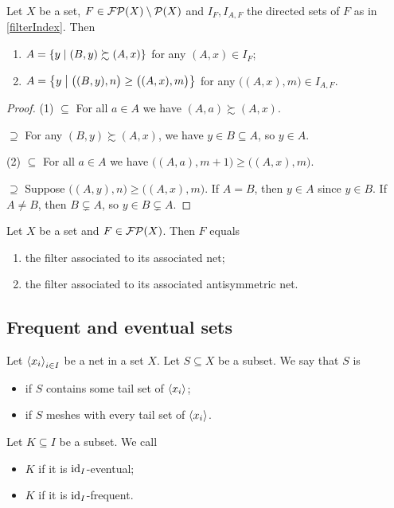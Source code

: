 \begin{lemma} \label{tailsFilterIndex}
Let $X$ be a set, $F\in\operatorname{\mathcal{FP}}(X)\setminus\operatorname{\mathcal{P}}(X)$ and $I_F, I_{A,F}$ the directed sets of $F$ as in \ref{filterIndex}. Then
\begin{enumerate}
\item $A = \setbuilder{y}{(B,y) \succsim (A,x)}$ for any $(A,x)\in I_F$;
\item $A = \setbuilder{y}{\big((B,y), n\big) \geq \big((A,x), m\big)}$ for any $\big((A,x), m\big)\in I_{A,F}$.
\end{enumerate}
\end{lemma}
\begin{proof}
(1) $\boxed{\subseteq}$ For all $a\in A$ we have $(A,a)\succsim (A,x)$.

$\boxed{\supseteq}$ For any $(B,y) \succsim (A,x)$, we have $y\in B\subseteq A$, so $y\in A$.

(2) $\boxed{\subseteq}$ For all $a\in A$ we have $\big((A,a), m+1\big) \geq \big((A,x), m\big)$.

$\boxed{\supseteq}$ Suppose $\big((A,y), n\big) \geq \big((A,x), m\big)$. If $A = B$, then $y\in A$ since $y\in B$. If $A\neq B$, then $B\subsetneq A$, so $y\in B \subsetneq A$.
\end{proof}
\begin{corollary}
Let $X$ be a set and $F\in\operatorname{\mathcal{FP}}(X)$. Then $F$ equals
\begin{enumerate}
\item the filter associated to its associated net;
\item the filter associated to its associated antisymmetric net.
\end{enumerate}
\end{corollary}

\subsection{Frequent and eventual sets}
\begin{definition}
Let $\left\langle x_i \right\rangle_{i\in I}$ be a net in a set $X$. Let $S\subseteq X$ be a subset. We say that $S$ is
\begin{itemize}
\item {} if $S$ contains some tail set of $\left\langle x_i \right\rangle$;
\item {} if $S$ meshes with every tail set of $\left\langle x_i \right\rangle$.
\end{itemize}
Let $K\subseteq I$ be a subset. We call
\begin{itemize}
\item $K$  if it is $\operatorname{id}_I$-eventual;
\item $K$  if it is $\operatorname{id}_I$-frequent.
\end{itemize}
\end{definition}

